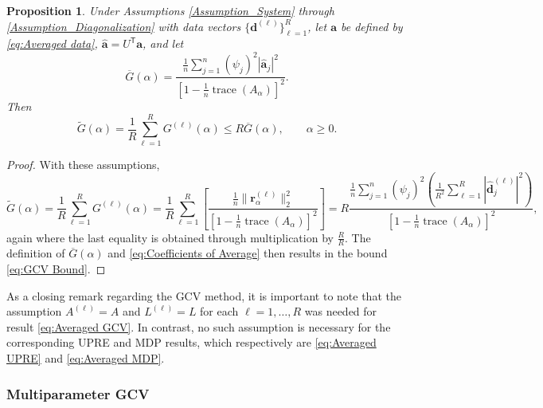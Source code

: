 \documentclass[12pt]{article}
\newcommand{\aVec}{\mathbf{a}}	%
\newcommand{\dVec}{\mathbf{d}}	%
\newcommand{\trans}[1]{{#1}^\mathsf{T}}	%
\DeclareMathOperator{\trace}{trace}		%
\newcommand{\dft}[1]{\widehat{#1}}	%
\newcommand{\regparam}{\alpha}  %
\newcommand{\mfilt}{\psi}
\newcommand{\regres}{\mathbf{r}_{\regparam}}	%
\newcommand{\A}{A_{\regparam}}	%
\newcommand{\G}{G}	%
\newtheorem{proposition}{Proposition}[section]
\begin{document}
\begin{proposition}
Under Assumptions \ref{Assumption_System} through \ref{Assumption_Diagonalization} with data vectors $\{\dVec^{(\ell)}\}_{\ell=1}^R$, let $\aVec$ be defined by \eqref{eq:Averaged data}, $\dft{\aVec} = \trans{U}\aVec$, and let
\begin{equation}
\label{eq:GCV of Average}
\overline{\G}(\regparam) = \frac{\frac{1}{n}\sum_{j=1}^{n} \left(\mfilt_j\right)^2|\dft{\aVec}_j|^2}{\left[1 - \frac{1}{n}\trace\left(\A\right)\right]^2}.
\end{equation}
Then
\begin{equation}
\label{eq:GCV Bound}
\widetilde{\G}(\regparam) = \frac{1}{R} \sum_{\ell=1}^R \G^{(\ell)}(\regparam) \leq R \overline{\G}(\regparam), \qquad \regparam \geq 0.
\end{equation}
\end{proposition}

\begin{proof}
With these assumptions,
\[\widetilde{\G}(\regparam) = \frac{1}{R} \sum_{\ell=1}^R \G^{(\ell)}(\regparam) = \frac{1}{R}\sum_{\ell=1}^R \left[\frac{\frac{1}{n}\|\regres^{(\ell)}\|_2^2}{\left[1 - \frac{1}{n}\trace\left(\A\right)\right]^2}\right]  = R\frac{\frac{1}{n}\sum_{j=1}^{n} \left(\mfilt_j\right)^2\left(\frac{1}{R^2} \sum_{\ell=1}^R |\dft{\dVec}_j^{(\ell)}|^2\right)}{\left[1 - \frac{1}{n}\trace\left(\A\right)\right]^2},\]
again where the last equality is obtained through multiplication by $\frac{R}{R}$. The definition of $\overline{\G}(\regparam)$ and \eqref{eq:Coefficients of Average} then results in the bound \eqref{eq:GCV Bound}.
\end{proof}

As a closing remark regarding the GCV method, it is important to note that the assumption $A^{(\ell)} = A$ and $L^{(\ell)} = L$ for each $\ell = 1,\ldots,R$ was needed for result \eqref{eq:Averaged GCV}. In contrast, no such assumption is necessary for the corresponding UPRE and MDP results, which respectively are \eqref{eq:Averaged UPRE} and \eqref{eq:Averaged MDP}.

\subsubsection{Multiparameter GCV} \label{sec:Multiparameter GCV}
\end{document}
